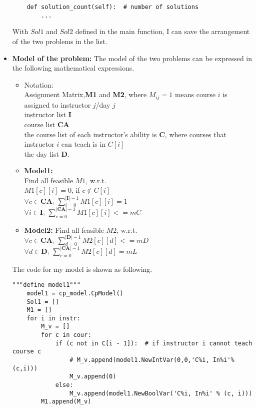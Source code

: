 \documentclass{article}
\begin{document}
\begin{itemize}
\begin{verbatim}
    def solution_count(self):  # number of solutions
        ...
    \end{verbatim}
With $Sol1$ and $Sol2$ defined in the main function, I can save the arrangement of the two problems in the list. 
\item \textbf{Model of the problem: }The model of the two problems can be expressed in the following mathematical expressions. 
\begin{itemize}
\item Notation:\\
Assignment Matrix,\textbf{M1} and \textbf{M2}, where $M_{ij}=1$ means course $i$ is assigned to instructor $j$/day $j$\\
instructor list \textbf{I}\\
course list \textbf{CA}\\
the course list of each instructor's ability is \textbf{C}, where courses that instructor $i$ can teach is in $C[i]$\\
the day list \textbf{D}. 
    \item \textbf{Model1:}\\
    Find all feasible $M1$, w.r.t.\\
    
    $M1[c][i]=0$, if $c\not\in C[i]$\\
    
    $\forall c\in\textbf{CA}$, $\sum_{i=0}^{|\textbf{I}|-1}M1[c][i]=1$\\
    
    $\forall i\in\textbf{I}$, $\sum_{c=0}^{|\textbf{CA}|-1}M1[c][i]<=mC$\\
    
    \item \textbf{Model2:}
    Find all feasible $M2$, w.r.t.\\
    
    $\forall c\in\textbf{CA}$, $\sum_{d=0}^{|\textbf{D}|-1}M2[c][d]<=mD$\\
    
    $\forall d\in\textbf{D}$, $\sum_{c=0}^{|\textbf{CA}|-1}M2[c][d]=mL$
\end{itemize}
The code for my model is shown as following. 
\begin{verbatim}
"""define model1"""
    model1 = cp_model.CpModel()
    Sol1 = []
    M1 = []
    for i in instr:
        M_v = []
        for c in cour:
            if (c not in C[i - 1]):  # if instructor i cannot teach course c
                # M_v.append(model1.NewIntVar(0,0,'C%i, In%i'%(c,i)))
                M_v.append(0)
            else:
                M_v.append(model1.NewBoolVar('C%i, In%i' % (c, i)))
        M1.append(M_v)


\end{verbatim}
\end{itemize}
\end{document}
